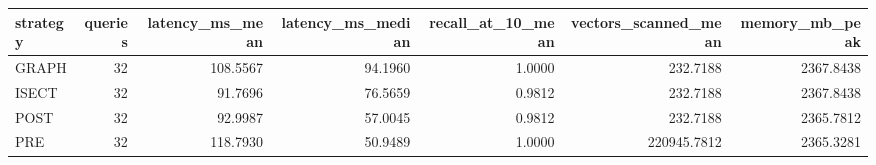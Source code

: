 \begin{tabular}{lrrrrrr}
\toprule
strategy & queries & latency_ms_mean & latency_ms_median & recall_at_10_mean & vectors_scanned_mean & memory_mb_peak \\
\midrule
GRAPH & 32 & 108.5567 & 94.1960 & 1.0000 & 232.7188 & 2367.8438 \\
ISECT & 32 & 91.7696 & 76.5659 & 0.9812 & 232.7188 & 2367.8438 \\
POST & 32 & 92.9987 & 57.0045 & 0.9812 & 232.7188 & 2365.7812 \\
PRE & 32 & 118.7930 & 50.9489 & 1.0000 & 220945.7812 & 2365.3281 \\
\bottomrule
\end{tabular}
